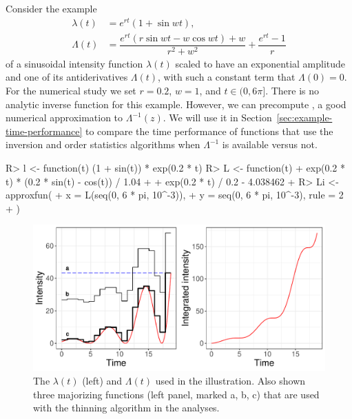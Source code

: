 \documentclass[article]{jss}\usepackage[]{graphicx}\usepackage[]{xcolor}
\makeatletter
\def\maxwidth{ %
  \ifdim\Gin@nat@width>\linewidth
    \linewidth
  \else
    \Gin@nat@width
  \fi
}
\newcommand{\fct}[1]{\code{#1()}}
\makeatother
\begin{document}
Consider the example
\begin{equation}\label{eq:illustration}
\begin{aligned}
\lambda(t) &= e^{rt}(1+\sin wt), \\
\Lambda(t) &= \dfrac{e^{rt}(r\sin wt - w\cos wt) + w}{r^2+w^2}+\dfrac{e^{rt}-1}{r} %
\end{aligned}
\end{equation}
of a sinusoidal intensity function $\lambda(t)$ scaled to have an exponential amplitude and one of its antiderivatives $\Lambda(t)$, with such a constant term that $\Lambda(0)=0$.  For the numerical study we set $r=0.2$, $w=1$, and $t \in (0, 6\pi]$. There is no  analytic inverse function for this example.
However, we can precompute \fct{Li}, a good numerical approximation to $\Lambda^{-1}(z)$. We will use it in Section~\ref{sec:example-time-performance} to compare the time performance of functions that use the inversion and order statistics algorithms when $\Lambda^{-1}$ is available versus not.
\begin{Schunk}
\begin{Sinput}
R> l <- function(t) (1 + sin(t)) * exp(0.2 * t)
R> L <- function(t) {
+    exp(0.2 * t) * (0.2 * sin(t) - cos(t)) / 1.04 +
+      exp(0.2 * t) / 0.2 - 4.038462
+  }
R> Li <- approxfun(
+    x = L(seq(0, 6 * pi, 10^-3)),
+    y = seq(0, 6 * pi, 10^-3), rule = 2
+  )
\end{Sinput}
\end{Schunk}






\begin{Schunk}
\begin{figure}
\includegraphics[width=\maxwidth]{figure/example-function-plot-1} \caption[The $\lambda(t)$ (left) and $\Lambda(t)$ used in the illustration]{The $\lambda(t)$ (left) and $\Lambda(t)$ used in the illustration. Also shown three majorizing functions (left panel, marked a, b, c) that are used with the thinning algorithm in the analyses.}\label{fig:example-function-plot}
\end{figure}
\end{Schunk}
\end{document}
